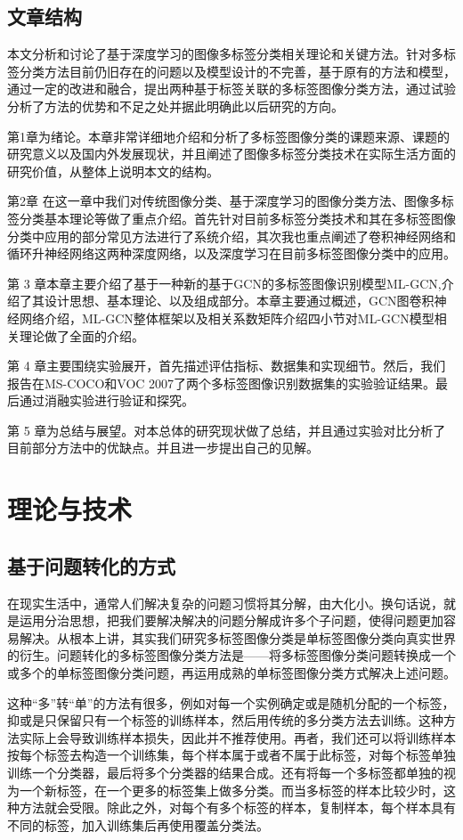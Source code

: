 \section{文章结构}
本文分析和讨论了基于深度学习的图像多标签分类相关理论和关键方法。针对多标签分类方法目前仍旧存在的问题以及模型设计的不完善，基于原有的方法和模型，通过一定的改进和融合，提出两种基于标签关联的多标签图像分类方法，通过试验分析了方法的优势和不足之处并据此明确此以后研究的方向。
 
第1章为绪论。本章非常详细地介绍和分析了多标签图像分类的课题来源、课题的研究意义以及国内外发展现状，并且阐述了图像多标签分类技术在实际生活方面的研究价值，从整体上说明本文的结构。

第2章  在这一章中我们对传统图像分类、基于深度学习的图像分类方法、图像多标签分类基本理论等做了重点介绍。首先针对目前多标签分类技术和其在多标签图像分类中应用的部分常见方法进行了系统介绍，其次我也重点阐述了卷积神经网络和循环升神经网络这两种深度网络，以及深度学习在目前多标签图像分类中的应用。

第 3 章本章主要介绍了基于一种新的基于GCN的多标签图像识别模型ML-GCN,介绍了其设计思想、基本理论、以及组成部分。本章主要通过概述，GCN图卷积神经网络介绍，ML-GCN整体框架以及相关系数矩阵介绍四小节对ML-GCN模型相关理论做了全面的介绍。

第 4 章主要围绕实验展开，首先描述评估指标、数据集和实现细节。然后，我们报告在MS-COCO\cite{Jiang2016CNN}和VOC 2007\cite{Zhang2007ML}了两个多标签图像识别数据集的实验验证结果。最后通过消融实验进行验证和探究。
 
第 5 章为总结与展望。对本总体的研究现状做了总结，并且通过实验对比分析了目前部分方法中的优缺点。并且进一步提出自己的见解。
 
\chapter{理论与技术}
\section{基于问题转化的方式}
在现实生活中，通常人们解决复杂的问题习惯将其分解，由大化小。换句话说，就是运用分治思想，把我们要解决解决的问题分解成许多个子问题，使得问题更加容易解决。从根本上讲，其实我们研究多标签图像分类是单标签图像分类向真实世界的衍生。问题转化的多标签图像分类方法是——将多标签图像分类问题转换成一个或多个的单标签图像分类问题，再运用成熟的单标签图像分类方式解决上述问题。

这种“多”转“单”的方法有很多，例如对每一个实例确定或是随机分配的一个标签，抑或是只保留只有一个标签的训练样本，然后用传统的多分类方法去训练。这种方法实际上会导致训练样本损失，因此并不推荐使用。再者，我们还可以将训练样本按每个标签去构造一个训练集，每个样本属于或者不属于此标签，对每个标签单独训练一个分类器，最后将多个分类器的结果合成。还有将每一个多标签都单独的视为一个新标签，在一个更多的标签集上做多分类。而当多标签的样本比较少时，这种方法就会受限。除此之外，对每个有多个标签的样本，复制样本，每个样本具有不同的标签，加入训练集后再使用覆盖分类法。

